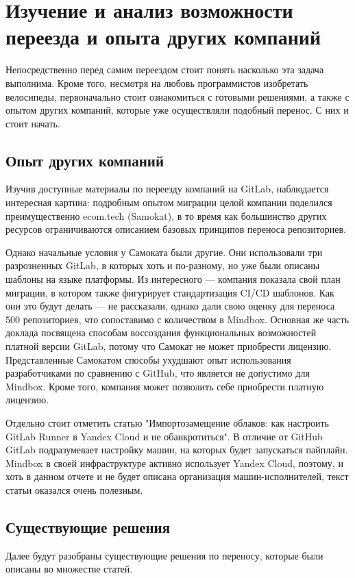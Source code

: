 \chapter{Изучение и анализ возможности переезда и опыта других компаний} \label{ch:ch1}
Непосредственно перед самим переездом стоит понять насколько эта задача выполнима.
Кроме того, несмотря на любовь программистов изобретать велосипеды,
первоначально стоит ознакомиться с готовыми решениями, а также с опытом других компаний,
которые уже осуществляли подобный перенос.
С них и стоит начать.


\section{Опыт других компаний}\label{sec:other-companies-expirience}
Изучив доступные материалы по переезду компаний на GitLab,
наблюдается интересная картина: подробным опытом миграции целой компании поделился преимущественно ecom.tech (Samokat),
в то время как большинство других ресурсов ограничиваются описанием базовых принципов переноса репозиториев.

Однако начальные условия у Самоката были другие.
Они использовали три разрозненных GitLab, в которых хоть и по-разному, но уже были описаны шаблоны на языке платформы.
Из интересного — компания показала свой план миграции, в котором также фигурирует стандартизация CI/CD шаблонов.
Как они это будут делать — не рассказали, однако дали свою оценку для переноса 500 репозиториев, что сопоставимо с количеством в Mindbox.
Основная же часть доклада посвящена способам воссоздания функциональных возможностей платной версии GitLab, потому что
Самокат не может приобрести лицензию.
Представленные Самокатом способы ухудшают опыт использования разработчиками по сравнению с GitHub,
что является не допустимо для Mindbox.
Кроме того, компания может позволить себе приобрести платную лицензию.

Отдельно стоит отметить статью "Импортозамещение облаков: как настроить GitLab Runner в Yandex Cloud и не обанкротиться".
В отличие от GitHub GitLab подразумевает настройку машин, на которых будет запускаться пайплайн.
Mindbox в своей инфраструктуре активно использует Yandex Cloud, поэтому, и хоть в данном отчете и не будет описана организация машин-исполнителей,
текст статьи оказался очень полезным.

\section{Существующие решения}\label{sec:existing-solutions}
Далее будут разобраны существующие решения по переносу, которые были описаны во множестве статей.

